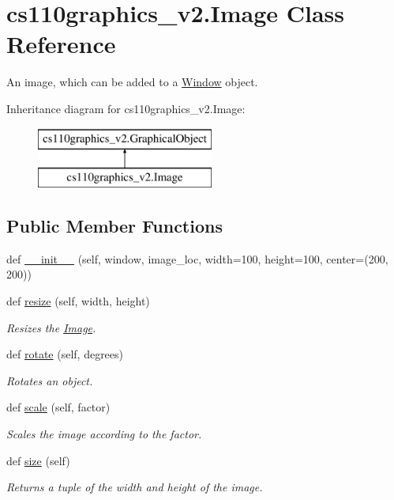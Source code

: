 \hypertarget{classcs110graphics__v2_1_1Image}{}\section{cs110graphics\+\_\+v2.\+Image Class Reference}
\label{classcs110graphics__v2_1_1Image}


An image, which can be added to a \mbox{\hyperlink{classcs110graphics__v2_1_1Window}{Window}} object.  


Inheritance diagram for cs110graphics\+\_\+v2.\+Image\+:\begin{figure}[H]
\begin{center}
\leavevmode
\includegraphics[height=2.000000cm]{classcs110graphics__v2_1_1Image}
\end{center}
\end{figure}
\subsection*{Public Member Functions}
\begin{DoxyCompactItemize}
\item 
def \mbox{\hyperlink{classcs110graphics__v2_1_1Image_a01429cee1632c0b5e26904701f1952cc}{\+\_\+\+\_\+init\+\_\+\+\_\+}} (self, window, image\+\_\+loc, width=100, height=100, center=(200, 200))
\item 
def \mbox{\hyperlink{classcs110graphics__v2_1_1Image_a55c1b238c7c79d2371321cf624d9f23d}{resize}} (self, width, height)
\begin{DoxyCompactList}\small\item\em Resizes the \mbox{\hyperlink{classcs110graphics__v2_1_1Image}{Image}}. \end{DoxyCompactList}\item 
def \mbox{\hyperlink{classcs110graphics__v2_1_1Image_aaa386a7e289febe8cdbed32bab605477}{rotate}} (self, degrees)
\begin{DoxyCompactList}\small\item\em Rotates an object. \end{DoxyCompactList}\item 
def \mbox{\hyperlink{classcs110graphics__v2_1_1Image_aa8ac3ee1d0b243e3398f949f8ff27cd6}{scale}} (self, factor)
\begin{DoxyCompactList}\small\item\em Scales the image according to the factor. \end{DoxyCompactList}\item 
def \mbox{\hyperlink{classcs110graphics__v2_1_1Image_a3ae3fd4aea37228fd427d6efa6d92d36}{size}} (self)
\begin{DoxyCompactList}\small\item\em Returns a tuple of the width and height of the image. \end{DoxyCompactList}\end{DoxyCompactItemize}


